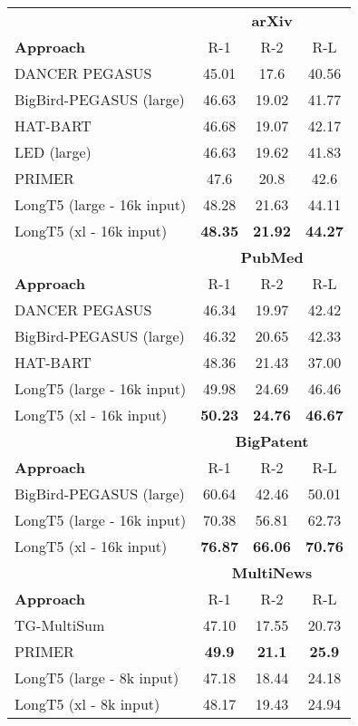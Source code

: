 \documentclass[11pt]{article}
\begin{document}
\begin{table}
\small
\centering
\begin{tabular}{lccc}
\toprule
& \multicolumn{3}{c}{\textbf{arXiv}} \\
\textbf{Approach} & R-1 & R-2 & R-L \\
\midrule
DANCER PEGASUS & 45.01 & 17.6 & 40.56  \\
BigBird-PEGASUS (large) & 46.63 & 19.02 & 41.77  \\
HAT-BART & 46.68 & 19.07 & 42.17  \\
LED (large) & 46.63 & 19.62 & 41.83   \\ PRIMER & 47.6 & 20.8 & 42.6  \\
\midrule
LongT5 (large - 16k input) & 48.28 & 21.63 & 44.11  \\
LongT5 (xl - 16k input) & \textbf{48.35} & \textbf{21.92} & \textbf{44.27} \\
\toprule
&  \multicolumn{3}{c}{\textbf{PubMed}} \\
\textbf{Approach} & R-1 & R-2 & R-L \\
\midrule
DANCER PEGASUS  & 46.34 & 19.97 & 42.42 \\
BigBird-PEGASUS (large)  & 46.32 & 20.65 & 42.33  \\
HAT-BART  & 48.36 & 21.43 & 37.00 \\
\midrule
LongT5 (large - 16k input) & 49.98 & 24.69 & 46.46 \\
LongT5 (xl - 16k input) &  \textbf{50.23} & \textbf{24.76} & \textbf{46.67} \\
\toprule
& \multicolumn{3}{c}{\textbf{BigPatent}} \\
\textbf{Approach} & R-1 & R-2 & R-L\\
\midrule
BigBird-PEGASUS (large) & 60.64 & 42.46 & 50.01 \\
\midrule
LongT5 (large - 16k input) & 70.38 & 56.81 & 62.73  \\
LongT5 (xl - 16k input) & \textbf{76.87} & \textbf{66.06} & \textbf{70.76}  \\
\toprule
& \multicolumn{3}{c}{\textbf{MultiNews}} \\
\textbf{Approach} & R-1 & R-2 & R-L\\
\midrule
TG-MultiSum  & 47.10 & 17.55 & 20.73 \\
PRIMER  & \textbf{49.9} & \textbf{21.1} & \textbf{25.9} \\
\midrule
LongT5 (large - 8k input) & 47.18 & 18.44 & 24.18 \\
LongT5 (xl - 8k input) & 48.17 & 19.43 & 24.94 \\

\end{tabular}
\end{table}
\end{document}
